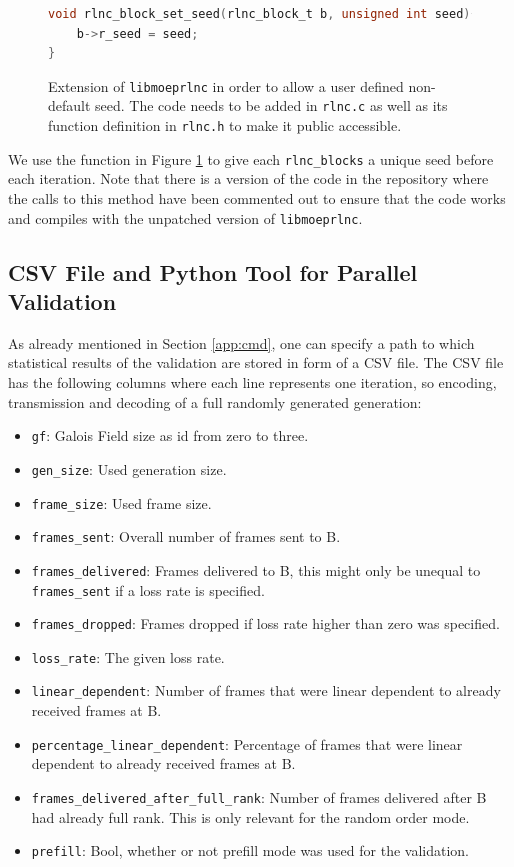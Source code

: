 \documentclass[a4paper,english,10pt]{tumarticle}
\begin{document}
\begin{figure}[h]
  \begin{lstlisting}[language=C]
void rlnc_block_set_seed(rlnc_block_t b, unsigned int seed){
    b->r_seed = seed;
}
\end{lstlisting}
  \caption[]{Extension of \texttt{libmoeprlnc} in order to allow a user defined non-default seed.
  The code needs to be added in \texttt{rlnc.c} as well as its function definition in
  \texttt{rlnc.h} to make it public accessible.}
  \label{code}
\end{figure}

We use the function in Figure \ref{code} to give each \texttt{rlnc\_blocks} a unique seed before
each iteration. Note that there is a version of the code in the repository where the calls to this
method have been commented out to ensure that the code works and compiles with the unpatched version
of \texttt{libmoeprlnc}.



\subsection{CSV File and Python Tool for Parallel Validation}

As already mentioned in Section \ref{app:cmd}, one can specify a path to which statistical results
of the validation are stored in form of a CSV file. The CSV file has the following columns where
each line represents one iteration, so encoding, transmission and decoding of a full randomly
generated generation:
\begin{itemize}
  \item \texttt{gf}: Galois Field size as id from zero to three.
  \item \texttt{gen\_size}: Used generation size.
  \item \texttt{frame\_size}: Used frame size.
  \item \texttt{frames\_sent}: Overall number of frames sent to B.
  \item \texttt{frames\_delivered}: Frames delivered to B, this might only be unequal to
  \texttt{frames\_sent} if a loss rate is specified.
  \item \texttt{frames\_dropped}: Frames dropped if loss rate higher than zero was specified.
  \item \texttt{loss\_rate}: The given loss rate.
  \item \texttt{linear\_dependent}: Number of frames that were linear dependent to already received
  frames at B.
  \item \texttt{percentage\_linear\_dependent}: Percentage of frames that were linear dependent to
  already received frames at B.
  \item \texttt{frames\_delivered\_after\_full\_rank}: Number of frames delivered after B had
  already full rank. This is only relevant for the random order mode.
  \item \texttt{prefill}: Bool, whether or not prefill mode was used for the validation.
\end{itemize}
\end{document}
